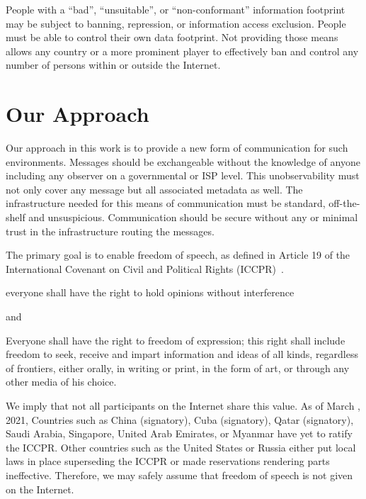 People with a ``bad'', ``unsuitable'', or ``non-conformant'' information footprint may be subject to banning, repression, or information access exclusion. People must be able to control their own data footprint. Not providing those means allows any country or a more prominent player to effectively ban and control any number of persons within or outside the Internet. 

\section{Our Approach}
Our approach in this work is to provide a new form of communication for such environments. Messages should be exchangeable without the knowledge of anyone including any observer on a governmental or ISP level. This unobservability must not only cover any message but all associated metadata as well. The infrastructure needed for this means of communication must be standard, off-the-shelf and unsuspicious. Communication should be secure without any or minimal trust in the infrastructure routing the messages.

The primary goal is to enable freedom of speech, as defined in Article 19 of the International Covenant on Civil and Political Rights (ICCPR)~\cite{iccpr}.
\begin{shadequote}{}
		everyone shall have the right to hold opinions without interference 
\end{shadequote}
and
\begin{shadequote}{}
	Everyone shall have the right to freedom of expression; this right shall include freedom to seek, receive and impart information and ideas of all kinds, regardless of frontiers, either orally, in writing or print, in the form of art, or through any other media of his choice.
\end{shadequote}

We imply that not all participants on the Internet share this value. As of March , 2021, Countries such as China (signatory), Cuba (signatory), Qatar (signatory), Saudi Arabia, Singapore, United Arab Emirates, or Myanmar have yet to ratify the ICCPR. Other countries such as the United States or Russia either put local laws in place superseding the ICCPR or made reservations rendering parts ineffective. Therefore, we may safely assume that freedom of speech is not given on the Internet.

